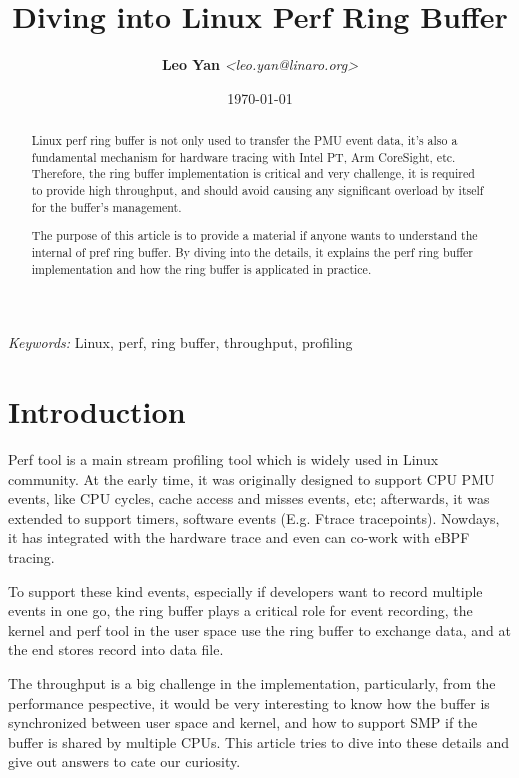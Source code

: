 \documentclass[11pt]{diazessay} %
\title{\textbf{Diving into Linux Perf Ring Buffer}}
\author{\textbf{Leo Yan} \textit{<leo.yan@linaro.org>}} %
\date{\today} %
\begin{document}
\maketitle %


\begin{abstract}
Linux perf ring buffer is not only used to transfer the PMU event data, it's also a fundamental mechanism for hardware tracing with Intel PT, Arm CoreSight, etc.  Therefore, the ring buffer implementation is critical and very challenge, it is required to provide high throughput, and should avoid causing any significant overload by itself for the buffer's management.

The purpose of this article is to provide a material if anyone wants to understand the internal of pref ring buffer. By diving into the details, it explains the perf ring buffer implementation and how the ring buffer is applicated in practice.
\end{abstract}

\hspace*{3.6mm}\textit{Keywords:} Linux, perf, ring buffer, throughput, profiling %
\vspace{30pt} %


\section*{Introduction}

Perf tool is a main stream profiling tool which is widely used in Linux community.  At the early time, it was originally designed to support CPU PMU events, like CPU cycles, cache access and misses events, etc; afterwards, it was extended to support timers, software events (E.g. Ftrace tracepoints).  Nowdays, it has integrated with the hardware trace and even can co-work with eBPF tracing.

To support these kind events, especially if developers want to record multiple events in one go, the ring buffer plays a critical role for event recording, the kernel and perf tool in the user space use the ring buffer to exchange data, and at the end stores record into data file.

The throughput is a big challenge in the implementation, particularly, from the performance pespective, it would be very interesting to know how the buffer is synchronized between user space and kernel, and how to support SMP if the buffer is shared by multiple CPUs.  This article tries to dive into these details and give out answers to cate our curiosity.
\end{document}
